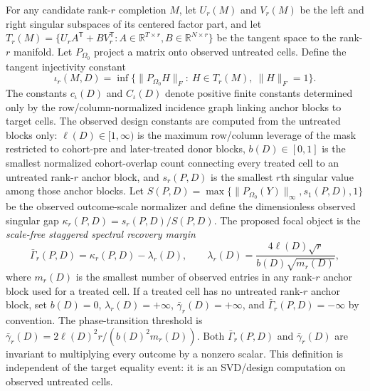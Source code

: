 \documentclass[11pt]{article}
\newcommand{\transpose}{\mathsf{T}}
\newcommand{\R}{\mathbb{R}}
\theoremstyle{definition}
\theoremstyle{plain}
\theoremstyle{remark}
\begin{document}
For any candidate rank-$r$ completion $M$, let $U_r(M)$ and $V_r(M)$ be the
left and right singular subspaces of its centered factor part, and let
$T_r(M)=\{U_r A^\transpose+B V_r^\transpose:A\in\R^{T\times r},
B\in\R^{N\times r}\}$ be the tangent space to the rank-$r$ manifold. Let
$P_{\Omega_0}$ project a matrix onto observed untreated cells. Define the
tangent injectivity constant
\[
\iota_r(M,D)=\inf\{\|P_{\Omega_0}H\|_F:\ H\in T_r(M),\ \|H\|_F=1\}.
\]
The constants $c_{\iota}(D)$ and $C_{\iota}(D)$ denote positive finite
constants determined only by the row/column-normalized incidence graph linking
anchor blocks to target cells.
The observed design constants are computed from the untreated blocks only:
$\ell(D)\in[1,\infty)$ is the maximum row/column leverage of the mask
restricted to cohort-pre and later-treated donor blocks, $b(D)\in[0,1]$ is the
smallest normalized cohort-overlap count connecting every treated cell to an
untreated rank-$r$ anchor block, and $s_r(P,D)$ is the smallest $r$th singular
value among those anchor blocks. Let
$S(P,D)=\max\{\|P_{\Omega_0}(Y)\|_{\infty},s_1(P,D),1\}$ be the observed
outcome-scale normalizer and define the dimensionless observed singular gap
$\kappa_r(P,D)=s_r(P,D)/S(P,D)$. The proposed focal object is the
\emph{scale-free staggered spectral recovery margin}
\[
\bar\Gamma_r(P,D)=\kappa_r(P,D)-\lambda_r(D),
\qquad
\lambda_r(D)=\frac{4\ell(D)\sqrt r}{b(D)\sqrt{m_r(D)}},
\]
where $m_r(D)$ is the smallest number of observed entries in any rank-$r$
anchor block used for a treated cell. If a treated cell has no untreated
rank-$r$ anchor block, set $b(D)=0$, $\lambda_r(D)=+\infty$,
$\bar\gamma_r(D)=+\infty$, and $\bar\Gamma_r(P,D)=-\infty$ by convention.
The phase-transition threshold is
$\bar\gamma_r(D)=2\ell(D)^2r/(b(D)^2m_r(D))$. Both
$\bar\Gamma_r(P,D)$ and $\bar\gamma_r(D)$ are invariant to multiplying every
outcome by a nonzero scalar. This definition is independent of the target
equality event: it is an SVD/design computation on observed untreated cells.
\end{document}
